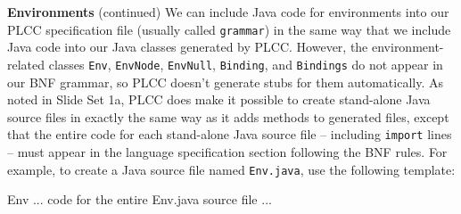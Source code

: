 \begin{minipage}[t]{\sw}
\slidenumber
\LARGE
{\bf Environments} (continued)\exx
We can include Java code for environments
into our PLCC specification file (usually called \verb'grammar')
in the same way that we include Java code
into our Java classes generated by PLCC.
However, the environment-related classes
\verb'Env', \verb'EnvNode', \verb'EnvNull',
\verb'Binding', and \verb'Bindings'
do not appear in our BNF grammar,
so PLCC doesn't generate stubs for them automatically.\exx
As noted in Slide Set 1a,
PLCC does make it possible to create stand-alone Java source files
in exactly the same way as it adds methods to generated files,
except that the entire code for each stand-alone Java source file --
including \verb'import' lines --
must appear in the language specification section
following the BNF rules.\exx
For example, to create a Java source file named \verb'Env.java',
use the following template:
\begin{qv}
Env
... code for the entire Env.java source file ...
\end{qv}
\end{minipage}
